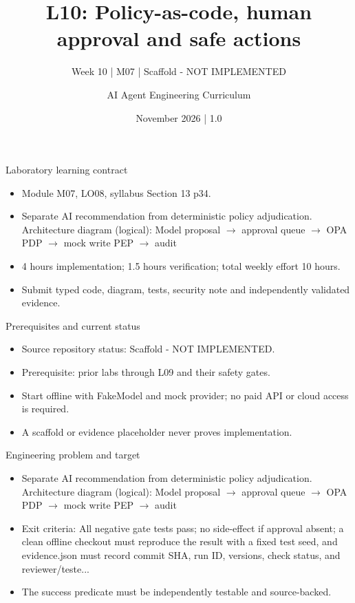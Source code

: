 \documentclass[aspectratio=169,10pt]{beamer}
\title[L10 - Agent Engineering]{L10: Policy-as-code, human approval and safe actions}
\subtitle{Week 10 | M07 | Scaffold - NOT IMPLEMENTED}
\author{AI Agent Engineering Curriculum}
\date{November 2026 | 1.0}
\begin{document}
\begin{frame}\titlepage\end{frame}

\begin{frame}{Laboratory learning contract}
\small
\begin{itemize}
\item Module M07, LO08, syllabus Section 13 p34.
\item Separate AI recommendation from deterministic policy adjudication. Architecture diagram (logical): Model proposal $\rightarrow$ approval queue $\rightarrow$ OPA PDP $\rightarrow$ mock write PEP $\rightarrow$ audit
\item 4 hours implementation; 1.5 hours verification; total weekly effort 10 hours.
\item Submit typed code, diagram, tests, security note and independently validated evidence.
\end{itemize}

\end{frame}

\begin{frame}{Prerequisites and current status}
\small
\begin{itemize}
\item Source repository status: Scaffold - NOT IMPLEMENTED.
\item Prerequisite: prior labs through L09 and their safety gates.
\item Start offline with FakeModel and mock provider; no paid API or cloud access is required.
\item A scaffold or evidence placeholder never proves implementation.
\end{itemize}

\end{frame}

\begin{frame}{Engineering problem and target}
\small
\begin{itemize}
\item Separate AI recommendation from deterministic policy adjudication. Architecture diagram (logical): Model proposal $\rightarrow$ approval queue $\rightarrow$ OPA PDP $\rightarrow$ mock write PEP $\rightarrow$ audit
\item Exit criteria: All negative gate tests pass; no side-effect if approval absent; a clean offline checkout must reproduce the result with a fixed test seed, and evidence.json must record commit SHA, run ID, versions, check status, and reviewer/teste...
\item The success predicate must be independently testable and source-backed.
\end{itemize}

\end{frame}
\end{document}
